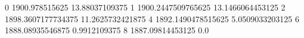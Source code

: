 0 1900.978515625 13.88037109375
1 1900.2447509765625 13.1466064453125
2 1898.3607177734375 11.2625732421875
4 1892.1490478515625 5.0509033203125
6 1888.08935546875 0.9912109375
8 1887.09814453125 0.0
